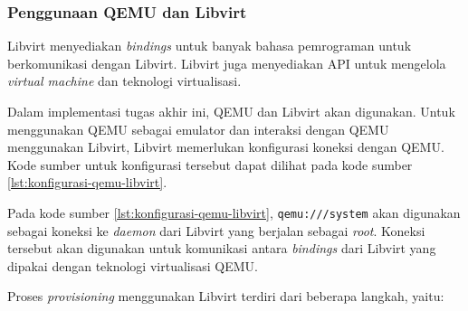 \subsubsection{Penggunaan QEMU dan Libvirt}
\label{sec:implementasi-libvirt}

Libvirt menyediakan \emph{bindings} untuk banyak bahasa pemrograman
untuk berkomunikasi dengan Libvirt. Libvirt juga menyediakan API untuk
mengelola \emph{virtual machine} dan teknologi virtualisasi.

Dalam implementasi tugas akhir ini, QEMU dan Libvirt akan digunakan.
Untuk menggunakan QEMU sebagai emulator dan interaksi dengan QEMU menggunakan Libvirt,
Libvirt memerlukan konfigurasi koneksi dengan QEMU. Kode sumber untuk konfigurasi
tersebut dapat dilihat pada kode sumber \ref{lst:konfigurasi-qemu-libvirt}.



Pada kode sumber \ref{lst:konfigurasi-qemu-libvirt}, \lstinline{qemu:///system} akan
digunakan sebagai koneksi ke \emph{daemon} dari Libvirt yang berjalan sebagai \emph{root}.
Koneksi tersebut akan digunakan untuk komunikasi antara \emph{bindings} dari Libvirt yang
dipakai dengan teknologi virtualisasi QEMU.

Proses \emph{provisioning} menggunakan Libvirt terdiri dari beberapa langkah, yaitu:

